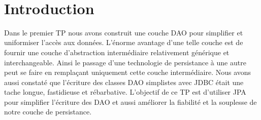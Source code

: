\documentclass[a4paper,11pt]{article}
\date{}
\begin{document}

\newlength{\niveauZero}
\newlength{\niveauUn}
\newlength{\niveauDeux}
\newlength{\niveauTrois}
\newlength{\niveauQuatre}
\newlength{\niveauCinq}

\newlength{\colonneZero}
\newlength{\colonneUn}
\newlength{\colonneDeux}
\newlength{\colonneTrois}
\newlength{\colonneQuatre}
\newlength{\colonneCinq}


\setcounter{compteurQuestion}{0}
\newcommand{\Question}{\paragraph*{Question~\thecompteurQuestion~:}\addtocounter{compteurQuestion}{1}}

{\centering
    \mbox{
    }
}\\[0.4cm]
\section{Introduction}

Dans le premier TP nous avons construit une couche DAO pour simplifier et uniformiser l'accès aux données. L'énorme 
avantage d'une telle couche est de fournir une couche d'abstraction intermédiaire relativement générique et 
interchangeable. Ainsi le passage d'une technologie de persistance à une autre peut se faire en remplaçant uniquement 
cette couche intermédiaire. Nous avons aussi constaté que l'écriture des classes DAO simplistes avec JDBC était une tache 
longue, fastidieuse et rébarbative. L'objectif de ce TP est d'utiliser JPA pour simplifier l'écriture des DAO et aussi 
améliorer la fiabilité et la souplesse de notre couche de persistance. 
\end{document}
